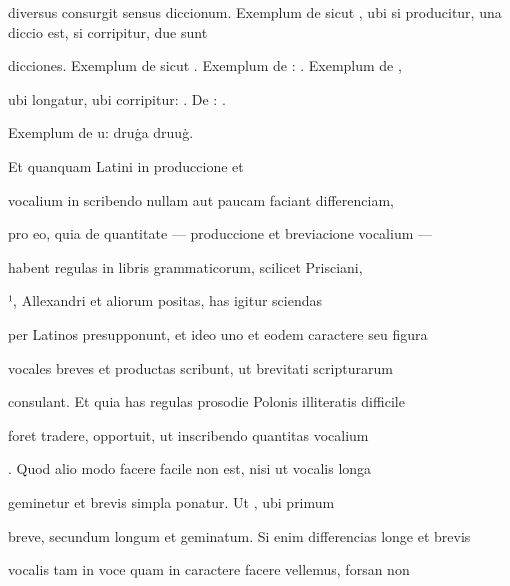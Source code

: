  diversus consurgit sensus diccionum. Exemplum de  sicut 
, ubi si  producitur, una diccio est, si corripitur, due sunt

dicciones. Exemplum de  sicut  . Exemplum de :  . Exemplum de , 

ubi longatur, ubi corripitur:  . De :  .

\splitlines{}

Exemplum de u: druġa druuġ.

\indentK Et quanquam Latini in produccione et 

\fulllines{}

 vocalium in scribendo nullam aut paucam faciant differenciam,

pro eo, quia de quantitate — produccione et breviacione vocalium — 

 habent regulas in libris grammaticorum, scilicet Prisciani,


¹, Allexandri et aliorum positas, has igitur sciendas

per Latinos presupponunt, et ideo uno et eodem caractere seu figura

vocales breves et productas scribunt, ut brevitati scripturarum

consulant. Et quia has regulas prosodie Polonis illiteratis difficile

foret tradere, opportuit, ut inscribendo quantitas vocalium 

. Quod alio modo facere facile non est, nisi ut vocalis longa

geminetur et brevis simpla ponatur. Ut , ubi primum 

breve, secundum longum et geminatum. Si enim differencias longe et brevis

vocalis tam in voce quam in caractere facere vellemus, forsan non

